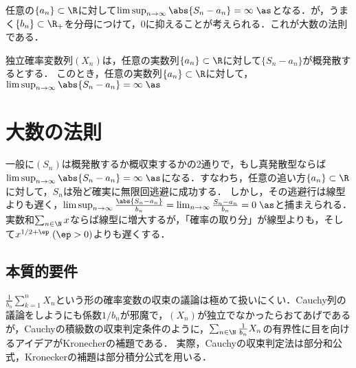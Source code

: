 \documentclass[uplatex,dvipdfmx]{jsreport}
\begin{document}
\begin{tcolorbox}[colframe=ForestGreen, colback=ForestGreen!10!white,breakable,colbacktitle=ForestGreen!40!white,coltitle=black,fonttitle=\bfseries\sffamily,
title=]
    任意の$\{a_n\}\subset\R$に対して$\limsup_{n\to\infty}\abs{S_n-a_n}=\infty\;\as$となる．が，うまく$\{b_n\}\subset\R_+$を分母につけて，$0$に抑えることが考えられる．これが大数の法則である．
\end{tcolorbox}

\begin{theorem}
    独立確率変数列$(X_n)$は，任意の実数列$\{a_n\}\subset\R$に対して$\{S_n-a_n\}$が概発散するとする．
    このとき，任意の実数列$\{a_n\}\subset\R$に対して，$\limsup_{n\to\infty}\abs{S_n-a_n}=\infty\;\as$
\end{theorem}

\section{大数の法則}

\begin{tcolorbox}[colframe=ForestGreen, colback=ForestGreen!10!white,breakable,colbacktitle=ForestGreen!40!white,coltitle=black,fonttitle=\bfseries\sffamily,
title=平均過程周りの揺らぎは線型よりも遅い]
    一般に$(S_n)$は概発散するか概収束するかの2通りで，もし真発散型ならば$\limsup_{n\to\infty}\abs{S_n-a_n}=\infty\;\as$になる．すなわち，任意の追い方$\{a_n\}\subset\R$に対して，$S_n$は殆ど確実に無限回逃避に成功する．
    しかし，その逃避行は線型よりも遅く，$\limsup_{n\to\infty}\frac{\abs{S_n-a_n}}{b_n}=\lim_{n\to\infty}\frac{S_n-a_n}{b_n}=0\;\as$と捕まえられる．
    実数和$\sum_{n\in\N}x$ならば線型に増大するが，「確率の取り分」が線型よりも，そして$x^{1/2+\ep}\;(\ep>0)$よりも遅くする．
\end{tcolorbox}

\subsection{本質的要件}

\begin{tcolorbox}[colframe=ForestGreen, colback=ForestGreen!10!white,breakable,colbacktitle=ForestGreen!40!white,coltitle=black,fonttitle=\bfseries\sffamily,
title=]
    $\frac{1}{b_n}\sum_{k=1}^nX_n$という形の確率変数の収束の議論は極めて扱いにくい．Cauchy列の議論をしようにも係数$1/b_n$が邪魔で，$(X_n)$が独立でなかったらおてあげであるが，Cauchyの積級数の収束判定条件のように，$\sum_{n\in\N}\frac{1}{b_n}X_n$の有界性に目を向けるアイデアがKronecherの補題である．
    実際，Cauchyの収束判定法は部分和公式，Kroneckerの補題は部分積分公式を用いる．
\end{tcolorbox}
\end{document}
